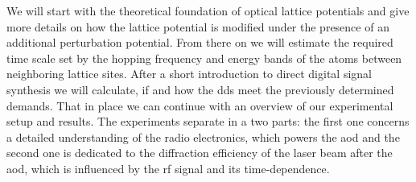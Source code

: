We will start with the theoretical foundation of optical lattice potentials
and give more details on how the lattice potential is modified under the
presence of an additional perturbation potential. From there on we will
estimate the required time scale set by the hopping frequency and energy bands
of the atoms between neighboring lattice sites. After a short introduction
to direct digital signal synthesis we will calculate, if and how the \gls{dds}
meet the previously determined demands. That in place we can continue with
an overview of our experimental setup and results. The experiments separate in
a two parts: the first one concerns a detailed understanding of the radio
electronics, which powers the \gls{aod} and the second one is dedicated to the
diffraction efficiency of the laser beam after the \gls{aod}, which is
influenced by the \gls{rf} signal and its time-dependence.

